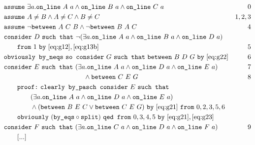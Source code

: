 \begin{boxedfigure}
\begin{align*}
& \code{assume}\ \exists a. \code{on\_line}\ A\ a\wedge\code{on\_line}\ B\ a\wedge\code{on\_line}\ C\ a & 0\\
& \code{assume}\ A\neq B \wedge A\neq C \wedge B \neq C & 1,2,3\\
& \code{assume}\ \neg\between{A}{C}{B} \wedge \neg\between{B}{A}{C} & 4\\
& \code{consider}\ D\ \code{such that}\ \Triangle{a}{A}{B}{D}\\
& \qquad\code{from}\ 1\ \code{by}\ \eqref{eq:g12},\eqref{eq:g13b}& 5\\
& \code{obviously by\_neqs}\ \code{so consider}\ G\ \code{such that}\ \between{B}{D}{G}\ \code{by}\ \eqref{eq:g22} & 6\\
& \code{consider}\ E\ \code{such that}\ (\exists a. \code{on\_line}\ A\ a\wedge \code{on\_line}\ D\ a\wedge \code{on\_line}\ E\ a) & 7\\
& \qquad\qquad\qquad\qquad\qquad\qquad \wedge\between{C}{E}{G}\ & 8\\
&\qquad \code{proof:}\ \code{clearly by\_pasch consider}\ E\ \code{such that}\\
&\qquad\qquad (\exists a. \code{on\_line}\ A\ a\wedge \code{on\_line}\ D\ a\wedge \code{on\_line}\ E\ a)\\
&\qquad\qquad \wedge (\between{B}{E}{C} \vee \between{C}{E}{G})\ \code{by}\ \eqref{eq:g21}\ \code{from}\ 0,2,3,5,6\\
&\qquad\code{obviously}\ (\code{by\_eqs}\circ\code{split})\ \code{qed from}\ 0,3,4,5\ \code{by}\ \eqref{eq:g21},\eqref{eq:g23}\\
& \code{consider}\ F\ \code{such that}\ (\exists a. \code{on\_line}\ C\ a\wedge \code{on\_line}\ D\ a\wedge \code{on\_line}\ F\ a) & 9\\
&\qquad[...]\\

\end{align*}
\end{boxedfigure}
